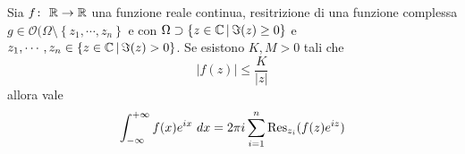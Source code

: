 \begin{proposition}[Caso II]
	\label{prop:caso-ii}
    Sia $f \colon\ \mathbb{R} \rightarrow \mathbb{R}$ una funzione reale continua, resitrizione di una
    funzione complessa $g \in \mathcal{O}(\Omega \setminus \left\{ z_1, \cdots,
    z_n\right\}$ e con $\Omega \supset \left\{ z \in \mathbb{C} \,\middle|\, \Im(z) \ge
    0\right\}$ e $z_1, \cdots, z_n \in \left\{ z \in \mathbb{C} \,\middle|\, \Im(z)
    > 0 \right\}$. Se esistono $K,M > 0$ tali che 
    \begin{equation*}
      |f(z)| \le \frac{K}{|z|}
    \end{equation*}
    allora vale 
    \begin{equation*}
      \int_{-\infty}^{+\infty} f(x) e^{ix} \ dx = 2\pi i \sum_{i=1}^n
      \operatorname{Res}_{z_i}(f(z) e^{iz})  
    \end{equation*}
\end{proposition}
